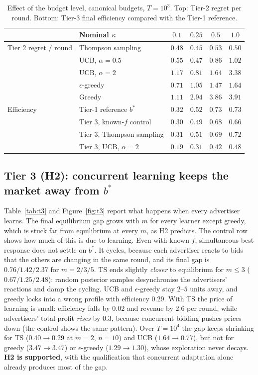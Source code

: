 \documentclass{article}
\theoremstyle{definition}
\begin{document}
\begin{table}[t]
\caption{Effect of the budget level, canonical budgets, $T=10^3$. Top: Tier-2 regret per round. Bottom:
Tier-3 final efficiency compared with the Tier-1 reference.}
\label{tab:kappa}
\centering\small
\begin{tabular}{@{}llcccc@{}}
\toprule
 & Nominal $\kappa$ & $0.1$ & $0.25$ & $0.5$ & $1.0$\\
\midrule
Tier 2 regret / round & Thompson sampling & $0.48$ & $0.45$ & $0.53$ & $0.50$\\
 & UCB, $\alpha=0.5$ & $0.55$ & $0.47$ & $0.86$ & $1.02$\\
 & UCB, $\alpha=2$ & $1.17$ & $0.81$ & $1.64$ & $3.38$\\
 & $\epsilon$-greedy & $0.71$ & $1.05$ & $1.47$ & $1.64$\\
 & Greedy & $1.11$ & $2.94$ & $3.86$ & $3.91$\\
\midrule
Efficiency & Tier-1 reference $b^\ast$ & $0.32$ & $0.52$ & $0.73$ & $0.73$\\
 & Tier 3, known-$f$ control & $0.30$ & $0.49$ & $0.68$ & $0.66$\\
 & Tier 3, Thompson sampling & $0.31$ & $0.51$ & $0.69$ & $0.72$\\
 & Tier 3, UCB, $\alpha=2$ & $0.19$ & $0.31$ & $0.42$ & $0.48$\\
\bottomrule
\end{tabular}
\end{table}

\subsection{Tier 3 (H2): concurrent learning keeps the market away from $b^\ast$}
Table~\ref{tab:t3} and Figure~\ref{fig:t3} report what happens when every advertiser learns. The final
equilibrium gap grows with $m$ for every learner except greedy, which is stuck far from equilibrium at
every $m$, as H2 predicts. The control row shows how much of this is due to learning. Even with known $f$,
simultaneous best response does not settle on $b^\ast$. It cycles, because each advertiser reacts to bids
that the others are changing in the same round, and its final gap is $0.76/1.42/2.37$ for $m=2/3/5$. TS ends
slightly \emph{closer} to equilibrium for $m\le3$ ($0.67/1.25/2.48$): random posterior samples
desynchronise the advertisers' reactions and damp the cycling. UCB and $\epsilon$-greedy stay $2$--$5$ units
away, and greedy locks into a wrong profile with efficiency $0.29$. With TS the price of learning is small:
efficiency falls by $0.02$ and revenue by $2.6$ per round, while advertisers' total profit \emph{rises} by
$0.3$, because concurrent bidding pushes prices down (the control shows the same pattern). Over
$T=10^4$ the gap keeps shrinking for TS ($0.40\to0.29$ at $m=2$, $n=10$) and UCB ($1.64\to0.77$), but not for
greedy ($3.47\to3.47$) or $\epsilon$-greedy ($1.29\to1.30$), whose exploration never decays.
\textbf{H2 is supported}, with the qualification that concurrent adaptation alone already produces most of
the gap.
\end{document}
